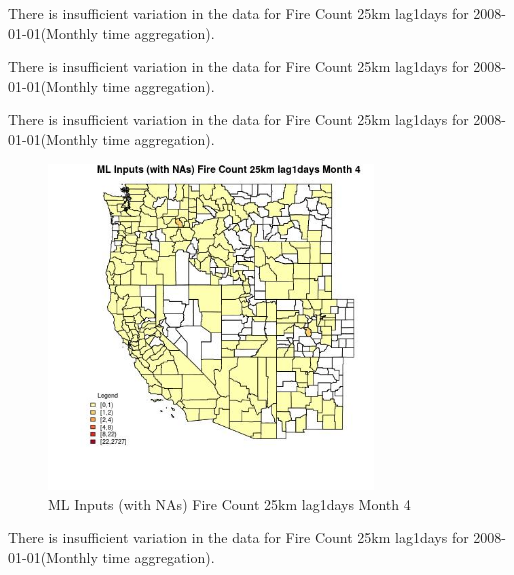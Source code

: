 There is insufficient variation in the data for Fire Count 25km lag1days for 2008-01-01(Monthly time aggregation). 
 

There is insufficient variation in the data for Fire Count 25km lag1days for 2008-01-01(Monthly time aggregation). 
 

There is insufficient variation in the data for Fire Count 25km lag1days for 2008-01-01(Monthly time aggregation). 
 

\begin{figure} 
\centering  
\includegraphics[width=0.77\textwidth]{Code_Outputs/Report_ML_input_PM25_Step4_part_f_de_duplicated_aves_prioritize_24hr_obswNAs_CountyFire_Count_25km_lag1daysmedianMonth4.jpg} 
\caption{\label{fig:Report_ML_input_PM25_Step4_part_f_de_duplicated_aves_prioritize_24hr_obswNAsCountyFire_Count_25km_lag1daysmedianMonth4}ML Inputs (with NAs) Fire Count 25km lag1days Month 4} 
\end{figure} 
 

There is insufficient variation in the data for Fire Count 25km lag1days for 2008-01-01(Monthly time aggregation). 
 

